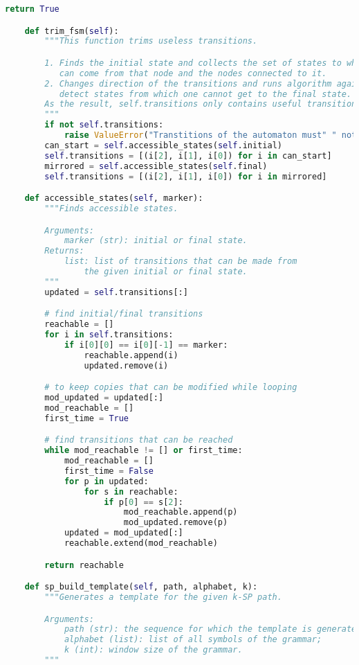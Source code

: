 \begin{lstlisting}[language=Python]
        return True

    def trim_fsm(self):
        """This function trims useless transitions.

        1. Finds the initial state and collects the set of states to which one
           can come from that node and the nodes connected to it.
        2. Changes direction of the transitions and runs algorithm again to
           detect states from which one cannot get to the final state.
        As the result, self.transitions only contains useful transitions.
        """
        if not self.transitions:
            raise ValueError("Transtitions of the automaton must" " not be emtpy.")
        can_start = self.accessible_states(self.initial)
        self.transitions = [(i[2], i[1], i[0]) for i in can_start]
        mirrored = self.accessible_states(self.final)
        self.transitions = [(i[2], i[1], i[0]) for i in mirrored]

    def accessible_states(self, marker):
        """Finds accessible states.

        Arguments:
            marker (str): initial or final state.
        Returns:
            list: list of transitions that can be made from
                the given initial or final state.
        """
        updated = self.transitions[:]

        # find initial/final transitions
        reachable = []
        for i in self.transitions:
            if i[0][0] == i[0][-1] == marker:
                reachable.append(i)
                updated.remove(i)

        # to keep copies that can be modified while looping
        mod_updated = updated[:]
        mod_reachable = []
        first_time = True

        # find transitions that can be reached
        while mod_reachable != [] or first_time:
            mod_reachable = []
            first_time = False
            for p in updated:
                for s in reachable:
                    if p[0] == s[2]:
                        mod_reachable.append(p)
                        mod_updated.remove(p)
            updated = mod_updated[:]
            reachable.extend(mod_reachable)

        return reachable

    def sp_build_template(self, path, alphabet, k):
        """Generates a template for the given k-SP path.

        Arguments:
            path (str): the sequence for which the template is generated;
            alphabet (list): list of all symbols of the grammar;
            k (int): window size of the grammar.
        """


\end{lstlisting}
